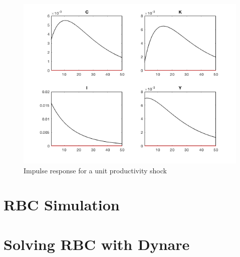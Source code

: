 \documentclass[11pt]{article}
\begin{document}
    \begin{figure}[h]
        \centering
        \caption{Impulse response for a unit productivity shock}
        \label{fig:imp2_impulse}
        \includegraphics[width=\textwidth]{imp2_impulse.png}
    \end{figure}

\clearpage

\appendix

\newpage

\section{RBC Simulation}

    

\newpage

\section{Solving RBC with Dynare}

    
\end{document}
